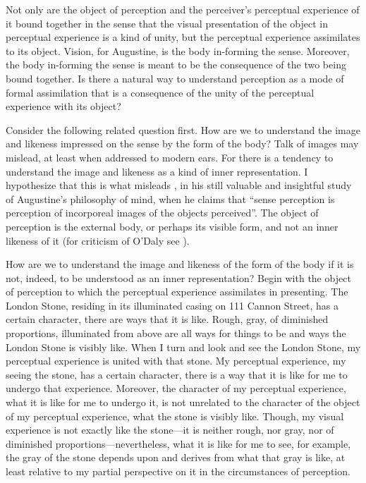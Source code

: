 \documentclass[12pt]{article}
\begin{document}
Not only are the object of perception and the perceiver's perceptual experience of it bound together in the sense that the visual presentation of the object in perceptual experience is a kind of unity, but the perceptual experience assimilates to its object. Vision, for Augustine, is the body in-forming the sense. Moreover, the body in-forming the sense is meant to be the consequence of the two being bound together. Is there a natural way to understand perception as a mode of formal assimilation that is a consequence of the unity of the perceptual experience with its object? 

Consider the following related question first. How are we to understand the image and likeness impressed on the sense by the form of the body? Talk of images may mislead, at least when addressed to modern ears. For there is a tendency to understand the image and likeness as a kind of inner representation. I hypothesize that this is what misleads \citet[106]{ODaly:1987fq}, in his still valuable and insightful study of Augustine's philosophy of mind, when he claims that ``sense perception is perception of incorporeal images of the objects perceived''. The object of perception is the external body, or perhaps its visible form, and not an inner likeness of it (for criticism of O'Daly see \citealt{Brittain:2002hl,Matthews:2014aa,Silva:2014bh}).

How are we to understand the image and likeness of the form of the body if it is not, indeed, to be understood as an inner representation? Begin with the object of perception to which the perceptual experience assimilates in presenting. The London Stone, residing in its illuminated casing on 111 Cannon Street, has a certain character, there are ways that it is like. Rough, gray, of diminished proportions, illuminated from above are all ways for things to be and ways the London Stone is visibly like. When I turn and look and see the London Stone, my perceptual experience is united with that stone. My perceptual experience, my seeing the stone, has a certain character, there is a way that it is like for me to undergo that experience. Moreover, the character of my perceptual experience, what it is like for me to undergo it, is not unrelated to the character of the object of my perceptual experience, what the stone is visibly like. Though, my visual experience is not exactly like the stone---it is neither rough, nor gray, nor of diminished proportions---nevertheless, what it is like for me to see, for example, the gray of the stone depends upon and derives from what that gray is like, at least relative to my partial perspective on it in the circumstances of perception. 
\end{document}
